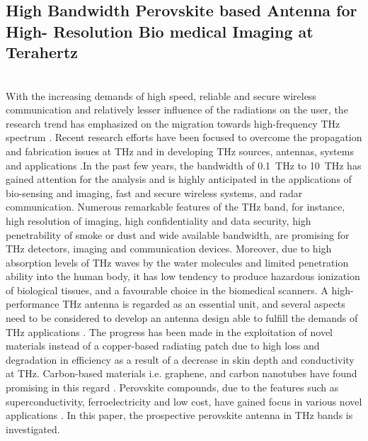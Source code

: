 \documentclass[12pt]{suhbook}
\begin{document}
\subsection{High Bandwidth Perovskite based Antenna for High- Resolution Bio medical Imaging at Terahertz}
 \\With the increasing demands of high speed, reliable and secure wireless communication and relatively lesser influence of the radiations on the user, the research trend has emphasized on the migration towards high-frequency THz spectrum \cite{ghann2017terahertz}\cite{rabbani2017liquid}. Recent research efforts have been focused to overcome the propagation and fabrication issues at THz and in developing THz sources, antennas, systems and applications \cite{siegel2002terahertz}.In the past few years, the bandwidth of \SI{0.1}{\THz} to \SI{10}{\THz} has gained attention for the analysis and is highly anticipated in the applications of bio-sensing and imaging, fast and secure wireless systems, and radar communication\cite{ranzani2013g}\cite{khatib2018response}. Numerous remarkable features of the THz band, for instance, high resolution of imaging, high confidentiality and data security, high penetrability of smoke or dust and wide available bandwidth, are promising for THz detectors, imaging and communication devices. Moreover, due to high absorption levels of THz waves by the water molecules and limited penetration ability into the human body, it has low tendency to produce hazardous ionization of biological tissues, and a favourable choice in the biomedical scanners. A high-performance THz antenna is regarded as an essential unit, and several aspects need to be considered to develop an antenna design able to fulfill the demands of THz applications \cite{chen2016research}. The progress has been made in the exploitation of novel materials instead of a copper-based radiating patch due to high loss and degradation in efficiency as a result of a decrease in skin depth and conductivity at THz. Carbon-based materials i.e. graphene, and carbon nanotubes have found promising in this regard \cite{naghdehforushha2017design}. Perovskite compounds, due to the features such as superconductivity, ferroelectricity and low cost, have gained focus in various novel applications \cite{huang2014low}. In this paper, the prospective perovskite antenna in THz bands is investigated.
\end{document}
